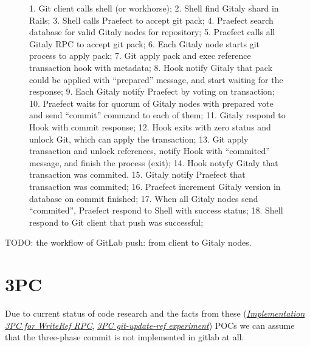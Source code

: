 \documentclass[acmlarge, screen, nonacm]{acmart}
\begin{document}
\begin{figure}
\begin{center}
  \end{center}
  \caption[GitLab repository push workflow]{
    1. Git client calls shell (or workhorse); 2. Shell find Gitaly shard in Rails; 3. Shell calls Praefect
    to accept git pack; 4. Praefect search database for valid Gitaly nodes for repository;
    5. Praefect calls all Gitaly RPC to accept git pack; 6. Each Gitaly node starts git process
    to apply pack; 7. Git apply pack and exec reference transaction hook with metadata;
    8. Hook notify Gitaly that pack could be applied with ``prepared'' message,
    and start waiting for the response;
    9. Each Gitaly notify Praefect by voting on transaction;
    10. Praefect waits for quorum of Gitaly nodes with prepared vote and
    send ``commit'' command to each of them;
    11. Gitaly respond to Hook with commit response;
    12. Hook exits with zero status and unlock Git, which can apply the transaction;
    13. Git apply transaction and unlock references, notify Hook with ``commited'' message,
    and finish the process (exit);
    14. Hook notyfy Gitaly that transaction was commited.
    15. Gitaly notify Praefect that transaction was commited;
    16. Praefect increment Gitaly version in database on commit finished;
    17. When all Gitaly nodes send ``commited'', Praefect respond to Shell with success status;
    18. Shell respond to Git client that push was successful;
  }\label{fig:push-workflow}
\end{figure}


TODO: the workflow of GitLab push: from client to Gitaly nodes.

\section{3PC}

Due to current status of code research and the facts from these 
(\emph{\href{https://gitlab.com/gitlab-org/gitaly/-/issues/2466}{Implementation 3PC for WriteRef RPC}},
\emph{\href{https://gitlab.com/gitlab-org/gitaly/-/issues/2529}{3PC git-update-ref experiment}})
POCs we can assume that the three-phase commit is not implemented in gitlab at all.
\end{document}
